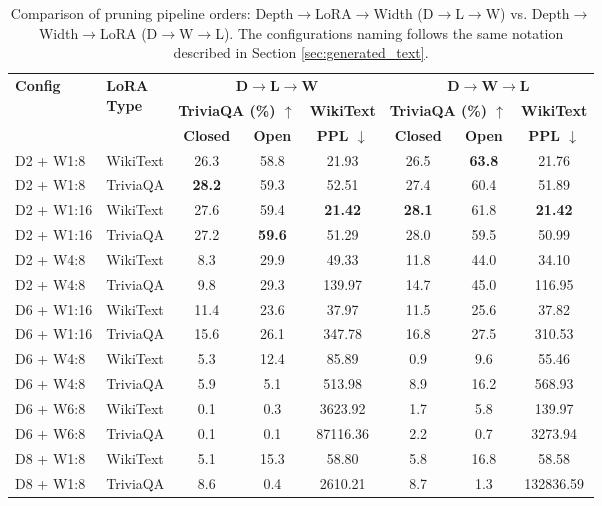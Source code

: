 \begin{table}[ht]
\centering
\caption[Depth$\rightarrow$LoRA$\rightarrow$Width vs. Depth$\rightarrow$Width$\rightarrow$LoRA]{Comparison of pruning pipeline orders: Depth$\rightarrow$LoRA$\rightarrow$Width (D$\rightarrow$L$\rightarrow$W) vs. Depth$\rightarrow$Width$\rightarrow$LoRA (D$\rightarrow$W$\rightarrow$L). The configurations naming follows the same notation described in Section \ref{sec:generated_text}.} \label{tab:dlw_pipeline_comparison}
{\scriptsize
\begin{tabular}{l|l|ccc|ccc}
\hline
\multirow{2}{*}{\textbf{Config}} & \multirow{2}{*}{\parbox{1.2cm}{\centering\textbf{LoRA}\\\textbf{Type}}} & \multicolumn{3}{c|}{\textbf{D$\rightarrow$L$\rightarrow$W}} & \multicolumn{3}{c}{\textbf{D$\rightarrow$W$\rightarrow$L}} \\
\cline{3-8}
& & \multicolumn{2}{c}{\textbf{TriviaQA (\%) $\uparrow$}} & \textbf{WikiText} & \multicolumn{2}{c}{\textbf{TriviaQA (\%) $\uparrow$}} & \textbf{WikiText} \\
\cline{3-4} \cline{6-7}
& & \textbf{Closed} & \textbf{Open} & \textbf{PPL $\downarrow$} & \textbf{Closed} & \textbf{Open} & \textbf{PPL $\downarrow$} \\
\hline
D2 + W1:8 & WikiText & 26.3 & 58.8 & 21.93 & 26.5 & \textbf{63.8} & 21.76 \\
D2 + W1:8 & TriviaQA & \textbf{28.2} & 59.3 & 52.51 & 27.4 & 60.4 & 51.89 \\
D2 + W1:16 & WikiText & 27.6 & 59.4 & \textbf{21.42} & \textbf{28.1} & 61.8 & \textbf{21.42} \\
D2 + W1:16 & TriviaQA & 27.2 & \textbf{59.6} & 51.29 & 28.0 & 59.5 & 50.99 \\
D2 + W4:8 & WikiText & 8.3 & 29.9 & 49.33 & 11.8 & 44.0 & 34.10 \\
D2 + W4:8 & TriviaQA & 9.8 & 29.3 & 139.97 & 14.7 & 45.0 & 116.95 \\
D6 + W1:16 & WikiText & 11.4 & 23.6 & 37.97 & 11.5 & 25.6 & 37.82 \\
D6 + W1:16 & TriviaQA & 15.6 & 26.1 & 347.78 & 16.8 & 27.5 & 310.53 \\
D6 + W4:8 & WikiText & 5.3 & 12.4 & 85.89 & 0.9 & 9.6 & 55.46 \\
D6 + W4:8 & TriviaQA & 5.9 & 5.1 & 513.98 & 8.9 & 16.2 & 568.93 \\
D6 + W6:8 & WikiText & 0.1 & 0.3 & 3623.92 & 1.7 & 5.8 & 139.97 \\
D6 + W6:8 & TriviaQA & 0.1 & 0.1 & 87116.36 & 2.2 & 0.7 & 3273.94 \\
D8 + W1:8 & WikiText & 5.1 & 15.3 & 58.80 & 5.8 & 16.8 & 58.58 \\
D8 + W1:8 & TriviaQA & 8.6 & 0.4 & 2610.21 & 8.7 & 1.3 & 132836.59 \\
\hline
\end{tabular}
}
\end{table}

